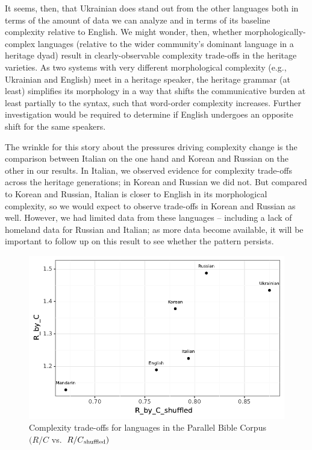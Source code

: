 \documentclass[output=paper]{langscibook}
\begin{document}
It seems, then, that Ukrainian does stand out from the other languages both in terms of the amount of data we can analyze and in terms of its baseline complexity relative to English. We might wonder, then, whether morphologically-complex languages (relative to the wider community's dominant language in a heritage dyad) result in clearly-observable complexity trade-offs in the heritage varieties. As two systems with very different morphological complexity (e.g., Ukrainian and English) meet in a heritage speaker, the heritage grammar (at least) simplifies its morphology in a way that shifts the communicative burden at least partially to the syntax, such that word-order complexity increases. 
Further investigation would be required to determine if English undergoes an opposite shift for the same speakers.

The wrinkle for this story about the pressures driving complexity change is the comparison between Italian on the one hand and Korean and Russian on the other in our results. In Italian, we observed evidence for complexity trade-offs across the heritage generations; in Korean and Russian we did not. But compared to Korean and Russian, Italian is closer to English in its morphological complexity, so we would expect to observe trade-offs in Korean and Russian as well. However, we had limited data from these languages -- including a lack of homeland data for Russian and Italian; as more data become available, it will be important to follow up on this result to see whether the pattern persists.

\begin{figure}[ht]
\includegraphics[width=\linewidth]{figures/ggplot_bible.pdf}
\caption{Complexity trade-offs for languages in the Parallel Bible Corpus $(R/C$  vs.~$R/C\textsubscript{shuffled})$}
\label{bible}
\end{figure}
\end{document}
